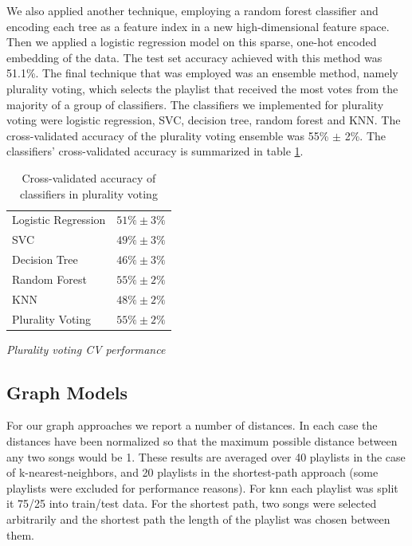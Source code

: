 \documentclass[acmtog]{acmart}
\begin{document}
\newpage

We also applied another technique, employing a random forest classifier and encoding each tree as a feature index in a new high-dimensional feature space. Then we applied a logistic regression model on this sparse, one-hot encoded embedding of the data. The test set accuracy achieved with this method was 51.1\%.
The final technique that was employed was an ensemble method, namely plurality voting, which selects the playlist that received the most votes from the majority of a group of classifiers. The classifiers we implemented for plurality voting were logistic regression, SVC, decision tree, random forest and KNN. The cross-validated accuracy of the plurality voting ensemble was 55\% $\pm$ 2\%. The classifiers' cross-validated accuracy is summarized in table \ref{tab:two}.
\begin{table}%
\caption{Cross-validated accuracy of classifiers in plurality voting}
\label{tab:two}
\begin{minipage}{\columnwidth}
\begin{center}
\begin{tabular}{ll}
  \toprule
  Logistic Regression    & $51\% \pm 3\%$\\
  SVC  & $49\% \pm 3\%$\\
  Decision Tree  & $46\% \pm 3\%$\\
  Random Forest  & $55\% \pm 2\%$\\
  KNN  & $48\% \pm 2\%$\\
  Plurality Voting  & $55\% \pm 2\%$\\
  \bottomrule
\end{tabular}
\end{center}
\bigskip\centering
\footnotesize
 \emph{Plurality voting CV performance}
\end{minipage}
\end{table}%

\subsection{Graph Models}

For our graph approaches we report a number of distances. In each case the distances have been normalized so that the maximum possible distance between any two songs would be 1. These results are averaged over
40 playlists in the case of k-nearest-neighbors, and 20 playlists in the shortest-path approach (some playlists were excluded for performance reasons). For knn each playlist was split it 75/25 into train/test data. For the shortest path, two songs were selected arbitrarily and the shortest path the length of the playlist was chosen between them.
\end{document}
